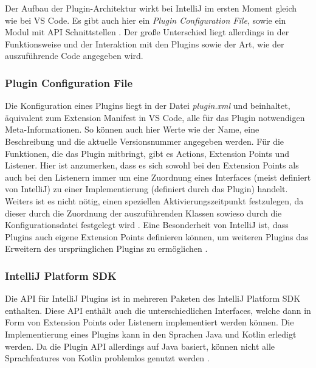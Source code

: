 Der Aufbau der Plugin-Architektur wirkt bei IntelliJ im ersten Moment 
gleich wie bei VS Code. Es gibt auch hier ein \emph{Plugin Configuration File}, 
sowie ein Modul mit API Schnittstellen \cite{IntelliJPlatformSDKPluginStructure}.
Der große Unterschied liegt allerdings in der Funktionsweise und der Interaktion
mit den Plugins sowie der Art, wie der auszuführende Code angegeben wird.
\subsubsection{Plugin Configuration File}
  Die Konfiguration eines Plugins liegt in der Datei \emph{plugin.xml} und
  beinhaltet, äquivalent zum Extension Manifest in VS Code, alle für das Plugin
  notwendigen Meta-Informationen. So können auch hier Werte wie der Name,
  eine Beschreibung und die aktuelle Versionsnummer angegeben werden.
  Für die Funktionen, die das Plugin mitbringt, gibt es Actions, Extension Points
  und Listener. Hier ist anzumerken, dass es sich sowohl bei den Extension Points
  als auch bei den Listenern immer um eine Zuordnung eines Interfaces
  (meist definiert von IntelliJ) zu einer Implementierung (definiert durch das Plugin)
  handelt. Weiters ist es nicht nötig, einen speziellen Aktivierungszeitpunkt
  festzulegen, da dieser durch die Zuordnung der auszuführenden Klassen sowieso durch 
  die Konfigurationsdatei festgelegt wird \cite{IntelliJPlatformSDKPluginConfigurationFile}. 
  Eine Besonderheit von IntelliJ ist,
  dass Plugins auch eigene Extension Points definieren können, um weiteren Plugins
  das Erweitern des ursprünglichen Plugins zu ermöglichen
  \cite{IntelliJPlatformSDKExtensionPoints}.
\subsubsection{IntelliJ Platform SDK}
  Die API für IntelliJ Plugins ist in mehreren Paketen des IntelliJ 
  Platform SDK enthalten. Diese API enthält auch die unterschiedlichen
  Interfaces, welche dann in Form von Extension Points oder Listenern implementiert
  werden können. Die Implementierung eines Plugins kann in den Sprachen Java
  und Kotlin erledigt werden. Da die Plugin API allerdings auf Java basiert, können
  nicht alle Sprachfeatures von Kotlin problemlos genutzt werden 
  \cite{IntelliJPlatformSDKConfiguringKotlinSupport}.
